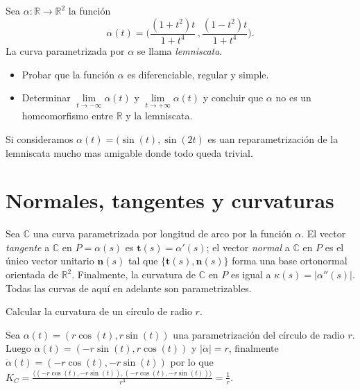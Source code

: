 \documentclass[11pt]{article}
\newcommand{\C}{\mathbb{C}}
\newcommand{\R}{{\mathbb{R}}}
\newcommand\abs[1]{\left\lvert#1\right\rvert}
\renewcommand\tt{\mathbf{t}}
\newcommand\nn{\mathbf{n}}
\newenvironment{proof}[1][Demostraci\'on]{\begin{trivlist}
		\item[\hskip \labelsep {\bfseries #1}]}{\end{trivlist}}
\newcommand{\qed}{\nobreak \ifvmode \relax \else
	\ifdim\lastskip<1.5em \hskip-\lastskip
	\hskip1.5em plus0em minus0.5em \fi \nobreak
	\vrule height0.75em width0.5em depth0.25em\fi}
\begin{document}
\begin{enumerate}
	
	\item Sea $\alpha:\R\to\R^2$ la funci\'on
	\[
	\alpha(t)=\bigg(\frac{(1+t^2)t}{1+t^4}\,,\frac{(1-t^2)t}{1+t^4}\bigg).
	\]
	La curva parametrizada por $\alpha$ se llama \emph{lemniscata}.

	\begin{itemize}
		\item Probar que la funci\'on $\alpha$ es diferenciable, regular y simple.
		
		\item Determinar $\lim\limits_{t\to-\infty}\alpha(t)$ y
		$\lim\limits_{t\to+\infty}\alpha(t)$ y concluir que $\alpha$ no es un homeomorfismo
		entre $\R$ y la lemniscata.
	\end{itemize}
	
	\label{Eercicio 5}
	
	\begin{proof}
		Si consideramos $\alpha(t) = (\sin(t), \sin(2t)$ es uan reparametrizaci\'on de la lemniscata mucho mas amigable donde todo queda trivial. \qed
	\end{proof}
	\section{Normales, tangentes y curvaturas}
	Sea $\C$ una curva parametrizada por longitud de arco por la funci\'on $\alpha$. El vector
	\emph{tangente} a $\C$ en $P = \alpha(s)$ es $\tt(s) = \alpha'(s)$; el vector
	\emph{normal} a $\C$ en $P$ es el \'unico vector unitario $\nn(s)$ tal que $\{\tt(s),
	\nn(s)\}$ forma una base ortonormal orientada de $\R^2$. Finalmente, la curvatura de $\C$
	en $P$ es igual a $\kappa(s) = |\alpha''(s)|$.\\
	
	Todas las curvas de aqu\'i en adelante son parametrizables.
	
	\item Calcular la curvatura de un c\'irculo de radio $r$.
	
	\label{Ejercicio 6}
	
	\begin{proof}
		
		Sea $\alpha(t) = (r\cos(t) , r \sin(t))$ una parametrizaci\'on del c\'irculo de radio $r$. Luego $\dot{\alpha}(t) = (-r \sin(t) , r\cos(t))$ y $\abs{\dot{\alpha}} = r$, finalmente $\ddot{\alpha}(t) = (-r \cos(t), -r \sin(t))$ por lo que $K_C = \frac{\langle (-r \cos(t), -r \sin(t)) , (-r \cos(t), -r \sin(t)) \rangle}{r^3} = \frac{1}{r}$.
		

\end{proof}
\end{enumerate}
\end{document}
